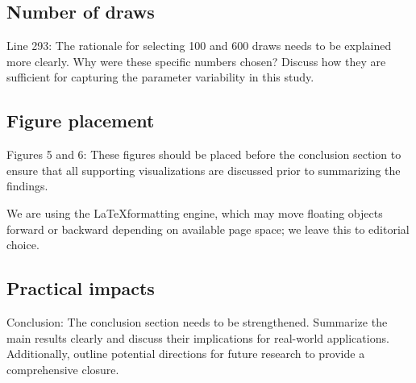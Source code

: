 \documentclass{ar2rc}
\begin{document}
\subsection{Number of draws}
\RC Line 293: The rationale for selecting 100 and 600 draws needs to be explained more clearly.
Why were these specific numbers chosen? Discuss how they are sufficient for capturing the
parameter variability in this study.

\subsection{Figure placement}
\RC Figures 5 and 6: These figures should be placed before the conclusion section to ensure that all
supporting visualizations are discussed prior to summarizing the findings.

\AR We are using the \LaTeX formatting engine, which may move floating objects forward or backward 
depending on available page space; we leave this to editorial choice.

\subsection{Practical impacts}
\RC Conclusion: The conclusion section needs to be strengthened. Summarize the main results
clearly and discuss their implications for real-world applications. Additionally, outline potential
directions for future research to provide a comprehensive closure.
\end{document}
